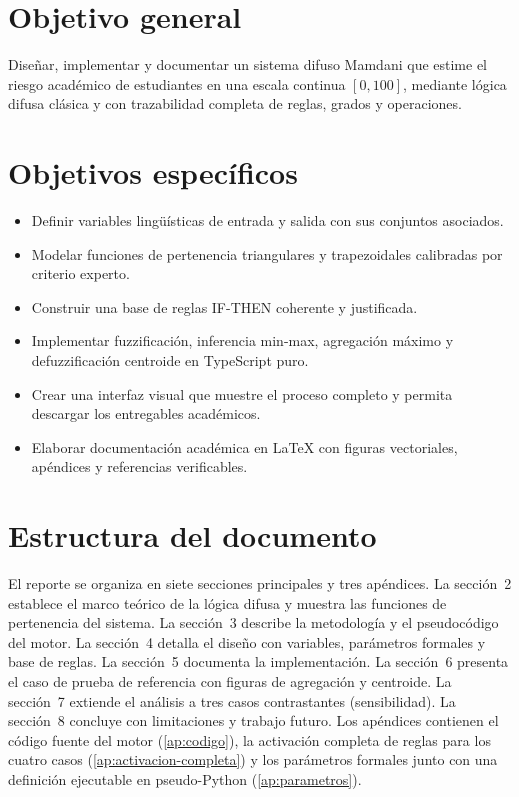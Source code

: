 \section{Objetivo general}

Diseñar, implementar y documentar un sistema difuso Mamdani que estime el riesgo académico de estudiantes en una escala continua $[0,100]$, mediante lógica difusa clásica y con trazabilidad completa de reglas, grados y operaciones.

\section{Objetivos específicos}

\begin{itemize}
  \item Definir variables lingüísticas de entrada y salida con sus conjuntos asociados.
  \item Modelar funciones de pertenencia triangulares y trapezoidales calibradas por criterio experto.
  \item Construir una base de reglas IF-THEN coherente y justificada.
  \item Implementar fuzzificación, inferencia min-max, agregación máximo y defuzzificación centroide en TypeScript puro.
  \item Crear una interfaz visual que muestre el proceso completo y permita descargar los entregables académicos.
  \item Elaborar documentación académica en \LaTeX{} con figuras vectoriales, apéndices y referencias verificables.
\end{itemize}

\section{Estructura del documento}

El reporte se organiza en siete secciones principales y tres apéndices. La sección~2 establece el marco teórico de la lógica difusa y muestra las funciones de pertenencia del sistema. La sección~3 describe la metodología y el pseudocódigo del motor. La sección~4 detalla el diseño con variables, parámetros formales y base de reglas. La sección~5 documenta la implementación. La sección~6 presenta el caso de prueba de referencia con figuras de agregación y centroide. La sección~7 extiende el análisis a tres casos contrastantes (sensibilidad). La sección~8 concluye con limitaciones y trabajo futuro. Los apéndices contienen el código fuente del motor (\ref{ap:codigo}), la activación completa de reglas para los cuatro casos (\ref{ap:activacion-completa}) y los parámetros formales junto con una definición ejecutable en pseudo-Python (\ref{ap:parametros}).
